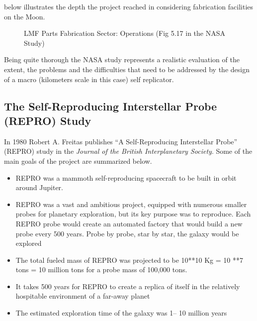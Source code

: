  below illustrates the depth the project reached in considering
fabrication facilities on the Moon.

\begin{figure}
	\label{fig:lmf_parts_fabrication}
	\caption{LMF Parts Fabrication Sector: Operations (Fig 5.17 in the NASA Study)}
\end{figure}

Being quite thorough the NASA study represents a realistic evaluation of
the extent, the problems and the difficulties that need to be addressed
by the design of a macro (kilometers scale in this case) self
replicator.

\subsection[The Self{}-Reproducing Interstellar Probe (REPRO) Study]{The
Self-Reproducing Interstellar Probe (REPRO) Study}

\hypertarget{RefHeading3156306210128}{}In 1980 Robert A. Freitas
publishes  “A Self-Reproducing Interstellar Probe” (REPRO) study  in
the \textit{Journal of the British Interplanetary Society}. Some of the
main goals of the project are summarized below.

\begin{itemize}
\item REPRO was a mammoth self-reproducing spacecraft to be built in
orbit around Jupiter.
\item REPRO was a vast and ambitious project, equipped with numerous
smaller probes for planetary exploration, but its key purpose was to
reproduce. Each REPRO probe would create an automated factory that
would build a new probe every 500 years. Probe by probe, star by star,
the galaxy would be explored 
\item The total fueled mass of REPRO was projected to be 10**10 Kg = 10
**7 tons = 10 million tons for a probe mass of 100,000 tons.
\item It takes 500 years for REPRO to create a replica of itself in the
relatively hospitable environment of a far-away planet
\item The estimated exploration time of the galaxy was 1– 10 million
years
\end{itemize}

